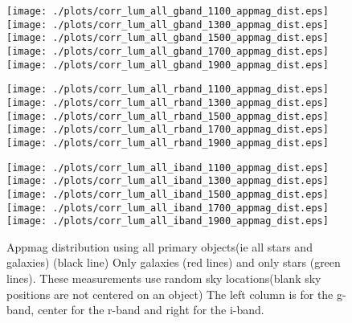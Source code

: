 \documentclass[10pt]{article}
\begin{document}
\begin{figure}
\centering
\begin{minipage}{0.32\textwidth}
 \texttt{[image: ./plots/corr\_lum\_all\_gband\_1100\_appmag\_dist.eps]}
 \texttt{[image: ./plots/corr\_lum\_all\_gband\_1300\_appmag\_dist.eps]}
 \texttt{[image: ./plots/corr\_lum\_all\_gband\_1500\_appmag\_dist.eps]}
 \texttt{[image: ./plots/corr\_lum\_all\_gband\_1700\_appmag\_dist.eps]}
 \texttt{[image: ./plots/corr\_lum\_all\_gband\_1900\_appmag\_dist.eps]}
\end{minipage}
\begin{minipage}{0.32\textwidth}
 \texttt{[image: ./plots/corr\_lum\_all\_rband\_1100\_appmag\_dist.eps]}
 \texttt{[image: ./plots/corr\_lum\_all\_rband\_1300\_appmag\_dist.eps]}
 \texttt{[image: ./plots/corr\_lum\_all\_rband\_1500\_appmag\_dist.eps]}
 \texttt{[image: ./plots/corr\_lum\_all\_rband\_1700\_appmag\_dist.eps]}
 \texttt{[image: ./plots/corr\_lum\_all\_rband\_1900\_appmag\_dist.eps]}
\end{minipage}
\begin{minipage}{0.32\textwidth}
 \texttt{[image: ./plots/corr\_lum\_all\_iband\_1100\_appmag\_dist.eps]}
 \texttt{[image: ./plots/corr\_lum\_all\_iband\_1300\_appmag\_dist.eps]}
 \texttt{[image: ./plots/corr\_lum\_all\_iband\_1500\_appmag\_dist.eps]}
 \texttt{[image: ./plots/corr\_lum\_all\_iband\_1700\_appmag\_dist.eps]}
 \texttt{[image: ./plots/corr\_lum\_all\_iband\_1900\_appmag\_dist.eps]}
\end{minipage}
\caption{Appmag distribution using all primary objects(ie all stars and galaxies) (black line) 
Only galaxies (red lines) and only stars (green lines).
These measurements use random sky locations(blank sky positions are not centered on an object)
The left column is for the g-band, center for the r-band and right for the i-band.
}
\end{figure}
\end{document}
